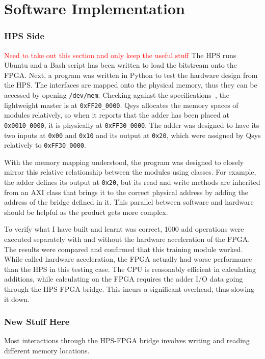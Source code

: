\chapter{Software Implementation}

\subsection{HPS Side}
\textcolor{red}{Need to take out this section and only keep the useful stuff}
The HPS runs Ubuntu and a Bash script has been written to load the bitstream onto the FPGA.
Next, a program was written in Python to test the hardware design from the HPS.
The interfaces are mapped onto the physical memory, thus they can be accessed by opening \texttt{/dev/mem}.
Checking against the specifications~\cite{Altera6}, the lightweight master is at \texttt{0xFF20\_0000}.
Qsys allocates the memory spaces of modules relatively, so when it reports that the adder has been placed at \texttt{0x0010\_0000}, it is physically at \texttt{0xFF30\_0000}.
The adder was designed to have its two inputs at \texttt{0x00} and \texttt{0x10} and its output at \texttt{0x20}, which were assigned by Qsys relatively to \texttt{0xFF30\_0000}.

With the memory mapping understood, the program was designed to closely mirror this relative relationship between the modules using classes.
For example, the adder defines its output at \texttt{0x20}, but its read and write methods are inherited from an AXI class that brings it to the correct physical address by adding the address of the bridge defined in it.
This parallel between software and hardware should be helpful as the product gets more complex.

To verify what I have built and learnt was correct, 1000 add operations were executed separately with and without the hardware acceleration of the FPGA.
The results were compared and confirmed that this training module worked.
While called hardware acceleration, the FPGA actually had worse performance than the HPS in this testing case.
The CPU is reasonably efficient in calculating additions, while calculating on the FPGA requires the adder I/O data going through the HPS-FPGA bridge.
This incurs a significant overhead, thus slowing it down.

\subsection{New Stuff Here}
Most interactions through the HPS-FPGA bridge involves writing and reading different memory locations.